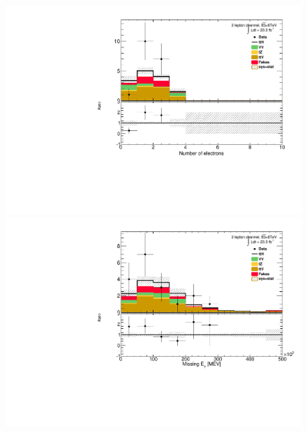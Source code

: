 \begin{figure}[!htbp]
\begin{minipage}[h]{0.5\textwidth}
  \end{minipage}\hfill
  \begin{minipage}[h]{0.5\textwidth}
    \centering \includegraphics[width=\textwidth]{figs/results/plotCand_3lep_NElec}
  \end{minipage}\hfill
  \begin{minipage}[h]{0.5\textwidth}
    \centering \includegraphics[width=\textwidth]{figs/results/plotCand_3lep_MET}
  \end{minipage}\hfill
  \begin{minipage}[h]{0.5\textwidth}

\end{minipage}
\end{figure}
